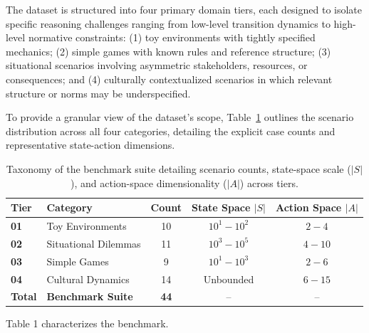 \documentclass{article}
\begin{document}
The dataset is structured into four primary domain tiers, each designed to isolate specific reasoning challenges ranging from low-level transition dynamics to high-level normative constraints:
(1) toy environments with tightly specified mechanics; (2) simple games with known rules and reference structure; (3) situational scenarios involving asymmetric stakeholders, resources, or consequences; and (4) culturally contextualized scenarios in which relevant structure or norms may be underspecified.

To provide a granular view of the dataset's scope, Table~\ref{tab:dataset_taxonomy} outlines the scenario distribution across all four categories, detailing the explicit case counts and representative state-action dimensions.

\begin{table}[t]
\centering
\small
\caption{Taxonomy of the benchmark suite detailing scenario counts, state-space scale ($|S|$), and action-space dimensionality ($|A|$) across tiers.}
\label{tab:dataset_taxonomy}
\begin{tabularx}{\linewidth}{l X c c c}
\toprule
\textbf{Tier} & \textbf{Category} & \textbf{Count} & \textbf{State Space $|S|$} & \textbf{Action Space $|A|$} \\
\midrule
\textbf{01} & Toy Environments & 10 & $10^1 - 10^2$ & $2 - 4$ \\
\textbf{02} & Situational Dilemmas & 11 & $10^3 - 10^5$ & $4 - 10$ \\
\textbf{03} & Simple Games & 9 & $10^1 - 10^3$ & $2 - 6$ \\
\textbf{04} & Cultural Dynamics & 14 & Unbounded & $6 - 15$ \\
\midrule
\textbf{Total} & \textbf{Benchmark Suite} & \textbf{44} & -- & -- \\
\bottomrule
\end{tabularx}
\end{table}
Table 1 characterizes the benchmark. %
\end{document}
